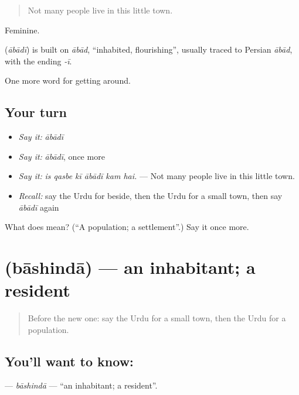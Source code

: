 \begin{quote}
Not many people live in this little town.
\end{quote}

Feminine.

\begin{cousinweb}
\textbf{} (\emph{ābādī}) is built on \emph{ābād}, \textquotedblleft{}inhabited, flourishing\textquotedblright{}, usually traced to Persian \emph{ābād}, with the ending \emph{-ī}.
\end{cousinweb}

\begin{grammarlens}[title={What you've built}]
One more word for getting around.
\end{grammarlens}

\subsection*{Your turn}
\begin{itemize}
\raggedright
  \item \emph{Say it:} \emph{ābādī}
  \item \emph{Say it:} \emph{ābādī}, once more
  \item \emph{Say it:} \emph{is qasbe kī ābādī kam hai.} — Not many people live in this little town.
  \item \emph{Recall:} say the Urdu for beside, then the Urdu for a small town, then say \emph{ābādī} again
\end{itemize}

\begin{tcolorbox}[breakable,colback=teal!4,colframe=teal!35!black,title={Before you move on}]
What does  mean? (\textquotedblleft{}A population; a settlement\textquotedblright{}.) Say it once more.
\end{tcolorbox}
\section[\texorpdfstring{\ur{باشندہ} (bāshindā)}{باشندہ (bāshindā)}]{ (bāshindā) — an inhabitant; a resident}

\label{lesson:UR-C412-bashinda}



\begin{quote}
Before the new one: say the Urdu for a small town, then the Urdu for a population.
\end{quote}

\subsection*{You'll want to know: }
\textbf{} — \emph{bāshindā} — \textquotedblleft{}an inhabitant; a resident\textquotedblright{}.

